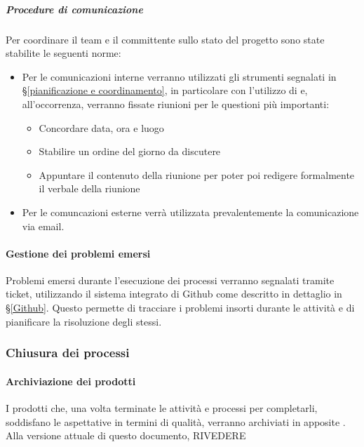 			\subparagraph{Procedure di comunicazione}
			Per coordinare il team e il committente sullo stato del progetto sono state stabilite le seguenti norme:
			\begin{itemize}
				\item Per le comunicazioni interne verranno utilizzati gli strumenti segnalati in \S\ref{pianificazione e coordinamento}, in particolare
					con l'utilizzo di  e, all'occorrenza, verranno fissate riunioni per le questioni più importanti:
					\begin{itemize}
						\item Concordare data, ora e luogo
						\item Stabilire un ordine del giorno da discutere
						\item Appuntare il contenuto della riunione per poter poi redigere formalmente il verbale della riunione
					\end{itemize}
				\item Per le comuncazioni esterne verrà utilizzata prevalentemente la comunicazione via email. %
			\end{itemize}


    		\paragraph{Gestione dei problemi emersi}
			Problemi emersi durante l'esecuzione dei processi verranno segnalati tramite ticket, utilizzando il sistema integrato di Github come descritto
			in dettaglio in \S\ref{Github}. Questo permette di tracciare i problemi insorti durante le attività e di pianificare la risoluzione degli stessi.


		\subsubsection{Chiusura dei processi}

    		\paragraph{Archiviazione dei prodotti} %
			I prodotti che, una volta terminate le attività e processi per completarli, soddisfano le aspettative in termini di qualità,
			verranno archiviati in apposite . Alla versione attuale di questo documento, RIVEDERE

